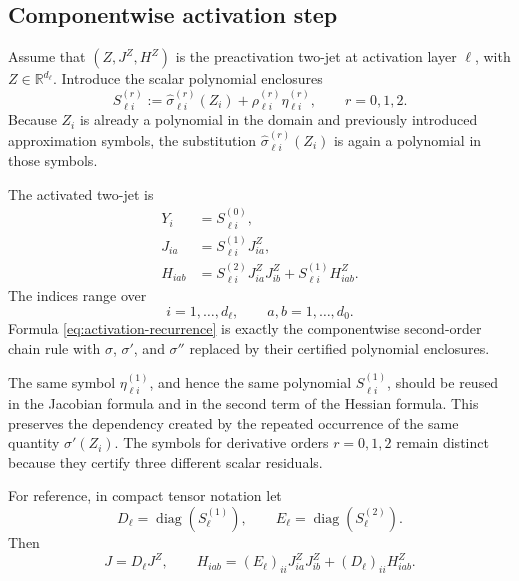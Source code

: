 \documentclass[11pt]{article}
\newcommand{\R}{\mathbb{R}}
\newcommand{\diag}{\operatorname{diag}}
\begin{document}
\subsection{Componentwise activation step}

Assume that \((Z,J^Z,H^Z)\) is the preactivation two-jet at activation layer
\(\ell\), with \(Z\in\R^{d_\ell}\).  Introduce the scalar polynomial
enclosures
\begin{equation}
    S_{\ell i}^{(r)}
    :=\widehat\sigma_{\ell i}^{(r)}(Z_i)
      +\rho_{\ell i}^{(r)}\eta_{\ell i}^{(r)},
    \qquad r=0,1,2.
    \label{eq:substituted-enclosure}
\end{equation}
Because \(Z_i\) is already a polynomial in the domain and previously
introduced approximation symbols, the substitution
\(\widehat\sigma_{\ell i}^{(r)}(Z_i)\) is again a polynomial in those symbols.

The activated two-jet is
\begin{equation}
    \boxed{
    \begin{aligned}
        Y_i
        &=S_{\ell i}^{(0)},\\
        J_{ia}
        &=S_{\ell i}^{(1)}J^Z_{ia},\\
        H_{iab}
        &=S_{\ell i}^{(2)}J^Z_{ia}J^Z_{ib}
          +S_{\ell i}^{(1)}H^Z_{iab}.
    \end{aligned}}
    \label{eq:activation-recurrence}
\end{equation}
The indices range over
\[
    i=1,\ldots,d_\ell,
    \qquad
    a,b=1,\ldots,d_0.
\]
Formula \eqref{eq:activation-recurrence} is exactly the componentwise
second-order chain rule with \(\sigma\), \(\sigma'\), and \(\sigma''\)
replaced by their certified polynomial enclosures.

The same symbol \(\eta_{\ell i}^{(1)}\), and hence the same polynomial
\(S_{\ell i}^{(1)}\), should be reused in the Jacobian formula and in the
second term of the Hessian formula.  This preserves the dependency created
by the repeated occurrence of the same quantity \(\sigma'(Z_i)\).
The symbols for derivative orders \(r=0,1,2\) remain distinct because they
certify three different scalar residuals.

For reference, in compact tensor notation let
\[
    D_\ell=\diag(S_\ell^{(1)}),
    \qquad
    E_\ell=\diag(S_\ell^{(2)}).
\]
Then
\begin{equation}
    J=D_\ell J^Z,
    \qquad
    H_{iab}
    =(E_\ell)_{ii}J^Z_{ia}J^Z_{ib}
      +(D_\ell)_{ii}H^Z_{iab}.
    \label{eq:compact-activation}
\end{equation}
\end{document}
